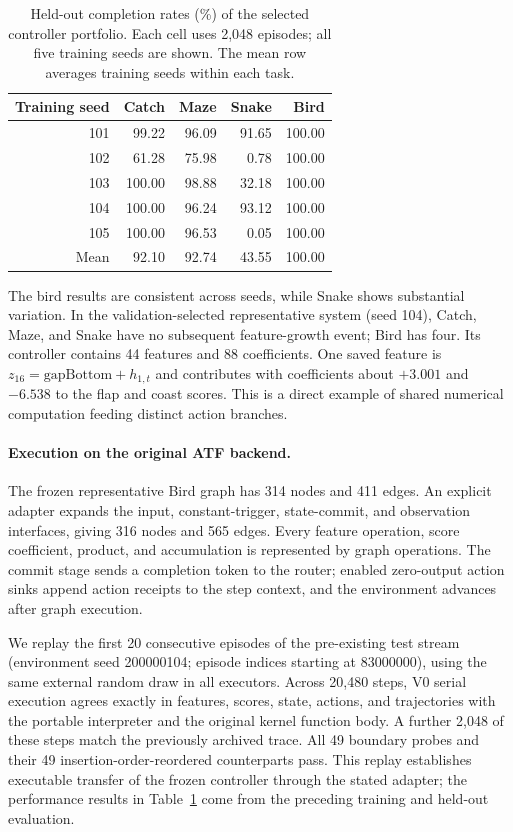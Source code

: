 \begin{table}[tb]
\centering
\small
\caption{Held-out completion rates (\%) of the selected controller portfolio.
Each cell uses 2,048 episodes; all five training seeds are shown. The mean row
averages training seeds within each task.}
\label{tab:revision_action_seeds}
\begin{tabular}{rrrrr}
\toprule
Training seed & Catch & Maze & Snake & Bird \\
\midrule
101 & 99.22 & 96.09 & 91.65 & 100.00 \\
102 & 61.28 & 75.98 & 0.78 & 100.00 \\
103 & 100.00 & 98.88 & 32.18 & 100.00 \\
104 & 100.00 & 96.24 & 93.12 & 100.00 \\
105 & 100.00 & 96.53 & 0.05 & 100.00 \\
\midrule
Mean & 92.10 & 92.74 & 43.55 & 100.00 \\
\bottomrule
\end{tabular}
\end{table}

The bird results are consistent across seeds, while Snake shows substantial
variation. In the validation-selected representative system (seed 104), Catch,
Maze, and Snake have no subsequent feature-growth event; Bird has four. Its
controller contains 44 features and 88 coefficients. One saved feature is
$z_{16}=\mathrm{gapBottom}+h_{1,t}$ and contributes with coefficients about
$+3.001$ and $-6.538$ to the flap and coast scores. This is a direct example of
shared numerical computation feeding distinct action branches.

\paragraph{Execution on the original ATF backend.}
The frozen representative Bird graph has 314 nodes and 411 edges. An explicit
adapter expands the input, constant-trigger, state-commit, and observation
interfaces, giving 316 nodes and 565 edges. Every feature operation, score
coefficient, product, and accumulation is represented by graph operations.
The commit stage sends a completion token to the router; enabled zero-output
action sinks append action receipts to the step context, and the environment
advances after graph execution.

We replay the first 20 consecutive episodes of the pre-existing test stream
(environment seed 200000104; episode indices starting at 83000000), using the
same external random draw in all executors. Across 20,480 steps, V0 serial
execution agrees exactly in features, scores, state, actions, and trajectories
with the portable interpreter and the original kernel function body. A further
2,048 of these steps match the previously archived trace. All 49 boundary
probes and their 49 insertion-order-reordered counterparts pass. This replay
establishes executable transfer of the frozen controller through the stated
adapter; the performance results in Table~\ref{tab:revision_action_seeds}
come from the preceding training and held-out evaluation.

